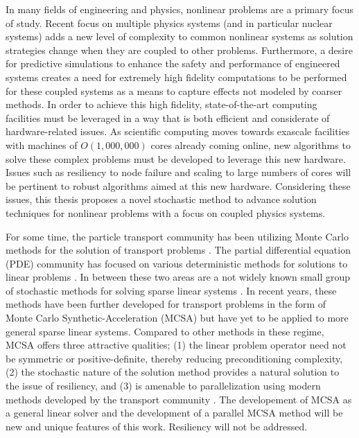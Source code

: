 \vcinfo{}

In many fields of engineering and physics, nonlinear problems are a
primary focus of study. Recent focus on multiple physics systems (and
in particular nuclear systems) adds a new level of complexity to
common nonlinear systems as solution strategies change when they are
coupled to other problems. Furthermore, a desire for predictive
simulations to enhance the safety and performance of engineered
systems creates a need for extremely high fidelity computations to be
performed for these coupled systems as a means to capture effects not
modeled by coarser methods. In order to achieve this high fidelity,
state-of-the-art computing facilities must be leveraged in a way that
is both efficient and considerate of hardware-related issues. As
scientific computing moves towards exascale facilities with machines
of $O(1,000,000)$ cores already coming online, new algorithms to solve
these complex problems must be developed to leverage this new
hardware. Issues such as resiliency to node failure and scaling to
large numbers of cores will be pertinent to robust algorithms aimed at
this new hardware. Considering these issues, this thesis proposes a
novel stochastic method to advance solution techniques for nonlinear
problems with a focus on coupled physics systems.

For some time, the particle transport community has been utilizing
Monte Carlo methods for the solution of transport problems
\cite{lewis_1993}. The partial differential equation (PDE) community
has focused on various deterministic methods for solutions to linear
problems \cite{saad_2003}. In between these two areas are a not widely
known small group of stochastic methods for solving sparse linear
systems \cite{hammersley_1964, halton_1962, halton_1994}. In recent
years, these methods have been further developed for transport
problems in the form of Monte Carlo Synthetic-Acceleration (MCSA)
\cite{evans_2003, evans_2009} but have yet to be applied to more
general sparse linear systems. Compared to other methods in these
regime, MCSA offers three attractive qualities; (1) the linear problem
operator need not be symmetric or positive-definite, thereby reducing
preconditioning complexity, (2) the stochastic nature of the
solution method provides a natural solution to the issue of resiliency,
and (3) is amenable to parallelization using modern methods developed by
the transport community \cite{wagner_2011}. The developement of MCSA
as a general linear solver and the development of a parallel MCSA
method will be new and unique features of this work. Resiliency will
not be addressed.

